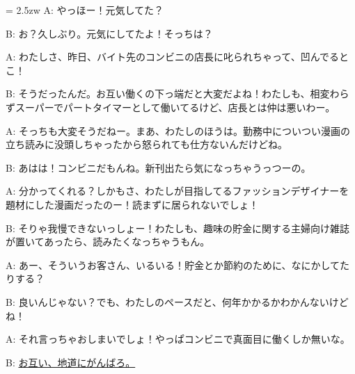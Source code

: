 \documentclass[11pt]{amsart}
\title{}
\author{}
\newenvironment{hangall}[1]{\hangindent = 2.5zw\everypar{\hangindent = 2.5zw}}{}
\begin{document}
\maketitle
\begin{hangall}{}%
A: やっほー！元気してた？

B: お？久しぶり。元気にしてたよ！そっちは？

A: わたしさ、昨日、バイト先のコンビニの店長に叱られちゃって、凹んでるとこ！

B: そうだったんだ。お互い働くの下っ端だと大変だよね！わたしも、相変わらずスーパーでパートタイマーとして働いてるけど、店長とは仲は悪いわー。

A: そっちも大変そうだねー。まあ、わたしのほうは。勤務中についつい漫画の立ち読みに没頭しちゃったから怒られても仕方ないんだけどね。

B: あはは！コンビニだもんね。新刊出たら気になっちゃうっつーの。

A: 分かってくれる？しかもさ、わたしが目指してるファッションデザイナーを題材にした漫画だったのー！読まずに居られないでしょ！

B: そりゃ我慢できないっしょー！わたしも、趣味の貯金に関する主婦向け雑誌が置いてあったら、読みたくなっちゃうもん。

A: あー、そういうお客さん、いるいる！貯金とか節約のために、なにかしてたりする？

B: 良いんじゃない？でも、わたしのペースだと、何年かかるかわかんないけどね！

A: それ言っちゃおしまいでしょ！やっぱコンビニで真面目に働くしか無いな。

B: \ul{お互い、地道にがんばろ。}\end{hangall}
\end{document}
